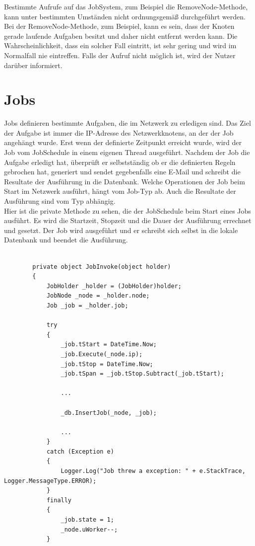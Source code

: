 \documentclass[12pt,a4paper]{report}
\begin{document}
\begin{onehalfspace}
Bestimmte Aufrufe auf das JobSystem, zum Beispiel die RemoveNode-Methode, kann unter bestimmten Umständen nicht ordnungsgemäß durchgeführt werden. Bei der RemoveNode-Methode, zum Beispiel, kann es sein, dass der Knoten gerade laufende Aufgaben besitzt und daher nicht entfernt werden kann. Die Wahrscheinlichkeit, dass ein solcher Fall eintritt, ist sehr gering und wird im Normalfall nie eintreffen. Falls der Aufruf nicht möglich ist, wird der Nutzer darüber informiert.

\chapter{Jobs}

Jobs definieren bestimmte Aufgaben, die im Netzwerk zu erledigen sind. Das Ziel der Aufgabe ist immer die IP-Adresse des Netzwerkknotens, an der der Job angehängt wurde. Erst wenn der definierte Zeitpunkt erreicht wurde, wird der Job vom JobSchedule in einem eigenen Thread ausgeführt. Nachdem der Job die Aufgabe erledigt hat, überprüft er selbstständig ob er die definierten Regeln gebrochen hat, generiert und sendet gegebenfalls eine E-Mail und schreibt die Resultate der Ausführung in die Datenbank. Welche Operationen der Job beim Start im Netzwerk ausführt, hängt vom Job-Typ ab. Auch die Resultate der Ausführung sind vom Typ abhängig.\\
Hier ist die private Methode zu sehen, die der JobSchedule beim Start eines Jobs ausführt. Es wird die Startzeit, Stopzeit und die Dauer der Ausführung errechnet und gesetzt. Der Job wird ausgeführt und er schreibt sich selbst in die lokale Datenbank und beendet die Ausführung.

\begin{lstlisting}
  
        private object JobInvoke(object holder)
        {
            JobHolder _holder = (JobHolder)holder;
            JobNode _node = _holder.node;
            Job _job = _holder.job;

            try
            {
                _job.tStart = DateTime.Now;
                _job.Execute(_node.ip);
                _job.tStop = DateTime.Now;
                _job.tSpan = _job.tStop.Subtract(_job.tStart);

              	...

                _db.InsertJob(_node, _job);

              	...
            }
            catch (Exception e)
            {
                Logger.Log("Job threw a exception: " + e.StackTrace, Logger.MessageType.ERROR);
            }
            finally
            {
                _job.state = 1;
                _node.uWorker--;
            }


\end{lstlisting}
\end{onehalfspace}
\end{document}
